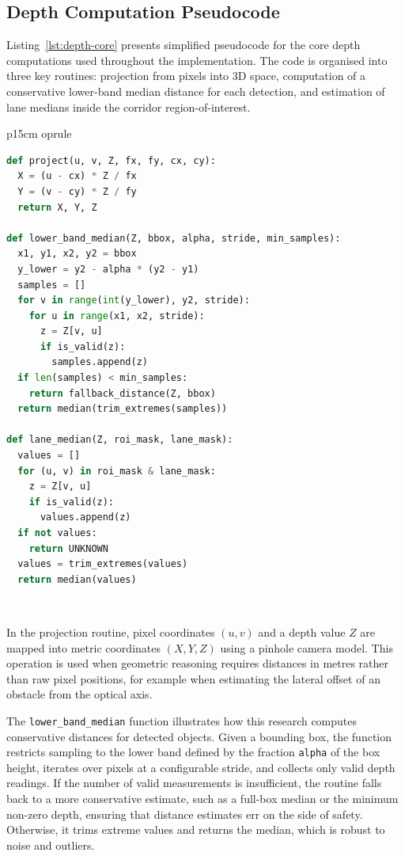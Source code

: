 \documentclass[11pt,a4paper]{article}
\newcommand{\code}[1]{\texttt{#1}}
\begin{document}
\subsection{Depth Computation Pseudocode}

Listing~\ref{lst:depth-core} presents simplified pseudocode for the core depth computations used throughout the implementation. The code is organised into three key routines: projection from pixels into 3D space, computation of a conservative lower-band median distance for each detection, and estimation of lane medians inside the corridor region-of-interest.

\begin{table}[h]
  \centering
  \small
  \begin{tabular}{p{15cm}}
  	oprule
\begin{lstlisting}[language=Python,basicstyle=\ttfamily\small]
def project(u, v, Z, fx, fy, cx, cy):
  X = (u - cx) * Z / fx
  Y = (v - cy) * Z / fy
  return X, Y, Z

def lower_band_median(Z, bbox, alpha, stride, min_samples):
  x1, y1, x2, y2 = bbox
  y_lower = y2 - alpha * (y2 - y1)
  samples = []
  for v in range(int(y_lower), y2, stride):
    for u in range(x1, x2, stride):
      z = Z[v, u]
      if is_valid(z):
        samples.append(z)
  if len(samples) < min_samples:
    return fallback_distance(Z, bbox)
  return median(trim_extremes(samples))

def lane_median(Z, roi_mask, lane_mask):
  values = []
  for (u, v) in roi_mask & lane_mask:
    z = Z[v, u]
    if is_valid(z):
      values.append(z)
  if not values:
    return UNKNOWN
  values = trim_extremes(values)
  return median(values)
\end{lstlisting}\\
  \bottomrule
  \end{tabular}
  \caption{Core depth computations: projection, conservative lower-band distance, and lane median estimation (schematic pseudocode).}
  \label{lst:depth-core}
\end{table}

In the projection routine, pixel coordinates $(u,v)$ and a depth value $Z$ are mapped into metric coordinates $(X,Y,Z)$ using a pinhole camera model. This operation is used when geometric reasoning requires distances in metres rather than raw pixel positions, for example when estimating the lateral offset of an obstacle from the optical axis.

The \code{lower\_band\_median} function illustrates how this research computes conservative distances for detected objects. Given a bounding box, the function restricts sampling to the lower band defined by the fraction \code{alpha} of the box height, iterates over pixels at a configurable stride, and collects only valid depth readings. If the number of valid measurements is insufficient, the routine falls back to a more conservative estimate, such as a full-box median or the minimum non-zero depth, ensuring that distance estimates err on the side of safety. Otherwise, it trims extreme values and returns the median, which is robust to noise and outliers.
\end{document}
